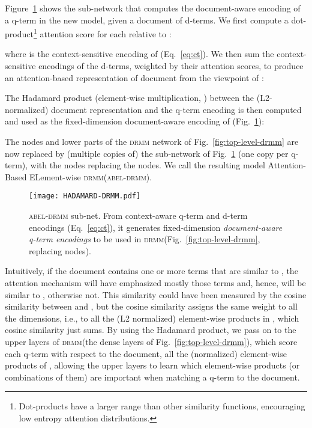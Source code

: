 \documentclass[11pt,a4paper]{article}
\newcommand{\drmm}{\textsc{drmm}\xspace}
\newcommand{\abeldrmm}{\textsc{abel-drmm}\xspace}
\begin{document}
Figure~\ref{fig:hadamard-drmm} shows the sub-network that computes the document-aware encoding of a q-term  in the new model, given a document  of  d-terms. We first compute a dot-product\footnote{Dot-products have a larger range than other similarity functions, encouraging low entropy attention distributions.} attention score  for each  relative to :

where  is the context-sensitive encoding of  (Eq.~\ref{eq:ct}). We then sum the context-sensitive encodings of the d-terms, weighted by their attention scores, to produce an attention-based representation  of document  from the viewpoint of :

The Hadamard product (element-wise multiplication, ) between 
the (L2-normalized) document representation  and the q-term encoding  is then computed and used as the fixed-dimension document-aware encoding  of  (Fig.~\ref{fig:hadamard-drmm}):

The  nodes and lower parts of the \drmm network of Fig.~\ref{fig:top-level-drmm} are now replaced by (multiple copies of) the sub-network of Fig.~\ref{fig:hadamard-drmm} (one copy per q-term), with the  nodes replacing the  nodes. We call the resulting model Attention-Based ELement-wise \drmm (\abeldrmm).

\begin{figure}[t]
\texttt{[image: HADAMARD-DRMM.pdf]}
\vspace{-0.12in}
\caption{\abeldrmm sub-net. From context-aware q-term and d-term encodings (Eq.~\ref{eq:ct}), it generates fixed-dimension \emph{document-aware q-term encodings} to be used in \drmm (Fig.~\ref{fig:top-level-drmm}, replacing  nodes).} 
\label{fig:hadamard-drmm}
\vspace{-4mm}
\end{figure}

Intuitively, if the document contains one or more terms  that are similar to , the attention mechanism will have emphasized mostly those terms and, hence,  will be similar to , otherwise not. This similarity could have been measured by 
the cosine similarity between  and , but the 
cosine similarity assigns the same weight to all the dimensions, i.e., to all the 
(L2 normalized) element-wise products in , which 
cosine similarity just sums. By using the Hadamard product, we pass on to the upper layers of \drmm (the dense layers of Fig.~\ref{fig:top-level-drmm}), which score each q-term with respect to the document, all the 
(normalized) element-wise products of , allowing the upper layers to learn which element-wise products (or combinations of them) are important when matching a q-term to the document.
\end{document}
